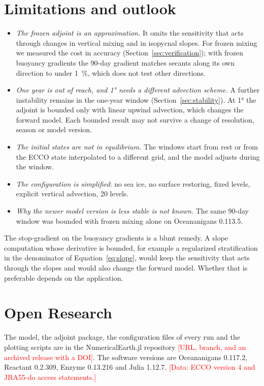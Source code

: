 \documentclass[11pt]{article}
\newcommand{\pending}[1]{\textcolor{red}{[#1]}}
\begin{document}
\section{Limitations and outlook}
\label{sec:limits}

\begin{itemize}
  \item \emph{The frozen adjoint is an approximation.} It omits the sensitivity that acts through changes in
        vertical mixing and in isopycnal slopes. For frozen mixing we measured the cost in accuracy
        (Section~\ref{sec:verification}); with frozen buoyancy gradients the 90-day gradient matches secants
        along its own direction to under \SI{1}{\percent}, which does not test other directions.
  \item \emph{One year is out of reach, and \ang{1} needs a different advection scheme.} A further instability
        remains in the one-year window (Section~\ref{sec:stability}). At \ang{1} the adjoint is bounded only with
        linear upwind advection, which changes the forward model. Each bounded result may not survive a change of
        resolution, season or model version.
  \item \emph{The initial states are not in equilibrium.} The windows start from rest or from the ECCO state
        interpolated to a different grid, and the model adjusts during the window.
  \item \emph{The configuration is simplified}: no sea ice, no surface restoring, fixed levels, explicit vertical
        advection, 20 levels.
  \item \emph{Why the newer model version is less stable is not known.} The same 90-day window was bounded with
        frozen mixing alone on Oceananigans 0.113.5.
\end{itemize}
The stop-gradient on the buoyancy gradients is a blunt remedy. A slope computation whose derivative is bounded,
for example a regularized stratification in the denominator of Equation~\ref{eq:slope}, would keep the
sensitivity that acts through the slopes and would also change the forward model. Whether that is preferable
depends on the application.

\section*{Open Research}
The model, the adjoint package, the configuration files of every run and the plotting scripts are in the
NumericalEarth.jl repository \pending{URL, branch, and an archived release with a DOI}. The software versions are
Oceananigans 0.117.2, Reactant 0.2.309, Enzyme 0.13.216 and Julia 1.12.7. \pending{Data: ECCO version 4 and
JRA55-do access statements.}
\end{document}

